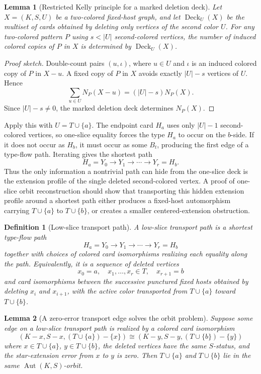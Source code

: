\documentclass[11pt]{article}
\newtheorem{lemma}{Lemma}
\newtheorem{definition}{Definition}
\newcommand{\Deck}{\operatorname{Deck}}
\begin{document}
\begin{lemma}[Restricted Kelly principle for a marked deletion deck]
Let \(X=(K,S,U)\) be a two-colored fixed-host graph, and let
\(\Deck_U(X)\) be the multiset of cards obtained by deleting only vertices of
the second color \(U\).  For any two-colored pattern \(P\) using
\(s<|U|\) second-colored vertices, the number of induced colored copies of
\(P\) in \(X\) is determined by \(\Deck_U(X)\).
\end{lemma}

\begin{proof}[Proof sketch]
Double-count pairs \((u,\iota)\), where \(u\in U\) and \(\iota\) is an induced
colored copy of \(P\) in \(X-u\).  A fixed copy of \(P\) in \(X\) avoids exactly
\(|U|-s\) vertices of \(U\).  Hence
\[
  \sum_{u\in U} N_P(X-u)=(|U|-s)N_P(X).
\]
Since \(|U|-s\neq 0\), the marked deletion deck determines \(N_P(X)\).
\end{proof}

Apply this with \(U=T\cup\{a\}\).  The endpoint card \(H_a\) uses only
\(|U|-1\) second-colored vertices, so one-slice equality forces the type
\(H_a\) to occur on the \(b\)-side.  If it does not occur as \(H_b\), it must
occur as some \(B_t\), producing the first edge of a type-flow path.  Iterating
gives the shortest path
\[
  H_a=Y_0\to Y_1\to\cdots\to Y_r=H_b.
\]
Thus the only information a nontrivial path can hide from the one-slice deck is
the extension profile of the single deleted second-colored vertex.  A proof of
one-slice orbit reconstruction should show that transporting this hidden
extension profile around a shortest path either produces a fixed-host
automorphism carrying \(T\cup\{a\}\) to \(T\cup\{b\}\), or creates a smaller
centered-extension obstruction.

\begin{definition}[Low-slice transport path]
A low-slice transport path is a shortest type-flow path
\[
  H_a=Y_0\to Y_1\to\cdots\to Y_r=H_b
\]
together with choices of colored card isomorphisms realizing each equality
along the path.  Equivalently, it is a sequence of deleted vertices
\[
  x_0=a,\quad x_1,\ldots,x_r\in T,\quad x_{r+1}=b
\]
and card isomorphisms between the successive punctured fixed hosts obtained by
deleting \(x_i\) and \(x_{i+1}\), with the active color transported from
\(T\cup\{a\}\) toward \(T\cup\{b\}\).
\end{definition}

\begin{lemma}[A zero-error transport edge solves the orbit problem]
Suppose some edge on a low-slice transport path is realized by a colored card
isomorphism
\[
  (K-x,S-x,(T\cup\{a\})-\{x\})
  \cong
  (K-y,S-y,(T\cup\{b\})-\{y\})
\]
where \(x\in T\cup\{a\}\), \(y\in T\cup\{b\}\), the deleted vertices have the
same \(S\)-status, and the star-extension error from \(x\) to \(y\) is zero.
Then \(T\cup\{a\}\) and \(T\cup\{b\}\) lie in the same
\(\operatorname{Aut}(K,S)\)-orbit.
\end{lemma}
\end{document}
